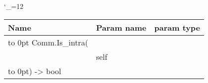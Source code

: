 \begingroup \catcode`\_=12 \tt
\begin{tabular}{lll}
\toprule
\textrm{Name}&\textrm{Param name}&\textrm{param type}\\
\midrule
\hbox to 0pt {Comm.Is_intra(\hss}\\
& self\\
\hbox to 0pt{) -> bool\hss}\\
\bottomrule
\end{tabular}
\endgroup
